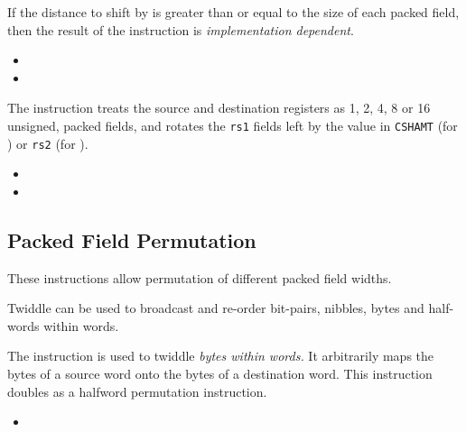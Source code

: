 If the distance to shift by is greater than or equal to the size of each
packed field, then the result of the  instruction is
{\em implementation dependent}.

\begin{itemize}
\item {}
\item {}
\end{itemize}

\ienc{\iencrotpx\iencrotipx}

The instruction  treats the source and destination registers as
1, 2, 4, 8 or 16 unsigned, packed fields, and rotates the {\tt rs1} fields
left by the value in {\tt CSHAMT} (for ) or {\tt rs2} 
(for ).

\begin{itemize}
\item {}
\item {}
\end{itemize}


\subsection{Packed Field Permutation}

These instructions allow permutation of different packed field widths.

Twiddle can be used to broadcast and re-order bit-pairs, nibbles, bytes
and half-words within words.

\ienc{\ienctwidb}

The  instruction is used to twiddle {\em bytes within words.}
It arbitrarily maps the bytes of a source word onto the bytes of a
destination word.
This instruction doubles as a halfword permutation instruction.

\begin{itemize}
\item {}
\end{itemize}

